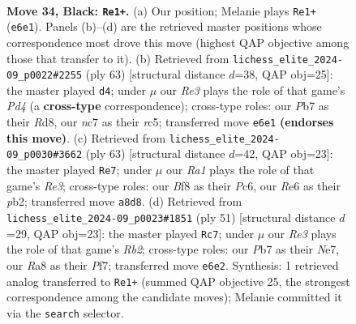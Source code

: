 \documentclass[11pt]{article}
\begin{document}
\clearpage

\begin{figure}[p]\centering
\begin{subfigure}{0.46\textwidth}\centering
\resizebox{\linewidth}{!}{%
\newchessgame
\chessboard[
  setfen={r4b2/ppN4k/4rpp1/7p/P7/6P1/RPP2P1P/6K1 b - - 0 34},
  showmover=false,
  pgfstyle=straightmove, color=movearrow, markmove={e6-e1}
]}
\caption{}
\end{subfigure}\hfill
\begin{subfigure}{0.46\textwidth}\centering
\resizebox{\linewidth}{!}{%
\newchessgame
\chessboard[
  setfen={3r2k1/pp2r1p1/6N1/2Rp4/8/1P5P/P4RP1/6K1 b - - 0 32},
  showmover=false,
  pgfstyle=straightmove, color=movearrow, markmove={d5-d4}
]}
\caption{}
\end{subfigure}
\\[4pt]
\begin{subfigure}{0.46\textwidth}\centering
\resizebox{\linewidth}{!}{%
\newchessgame
\chessboard[
  setfen={8/p5k1/2p1r2p/2N3p1/P7/2P2P2/1P3P1b/3R1K2 b - - 2 32},
  showmover=false,
  pgfstyle=straightmove, color=movearrow, markmove={e6-e7}
]}
\caption{}
\end{subfigure}\hfill
\begin{subfigure}{0.46\textwidth}\centering
\resizebox{\linewidth}{!}{%
\newchessgame
\chessboard[
  setfen={6k1/pr2npp1/3Np2p/2P5/8/4P1P1/P4PP1/2R3K1 b - - 2 26},
  showmover=false,
  pgfstyle=straightmove, color=movearrow, markmove={b7-c7}
]}
\caption{}
\end{subfigure}
\caption{\textbf{Move 34, Black: \texttt{Re1+}.} (a) Our position; Melanie plays \texttt{Re1+} (\texttt{e6e1}). Panels (b)--(d) are the retrieved master positions whose correspondence most drove this move (highest QAP objective among those that transfer to it). (b) Retrieved from \texttt{lichess\_elite\_2024-09\_p0022\#2255} (ply 63) [structural distance $d$=38, QAP obj=25]: the master played \texttt{d4}; under $\mu$ our \emph{Re3} plays the role of that game's \emph{Pd4} (a \textbf{cross-type} correspondence); cross-type roles: our \emph{P}b7 as their \emph{R}d8, our \emph{n}c7 as their \emph{r}c5; transferred move \texttt{e6e1} \textbf{(endorses this move)}. (c) Retrieved from \texttt{lichess\_elite\_2024-09\_p0030\#3662} (ply 63) [structural distance $d$=42, QAP obj=23]: the master played \texttt{Re7}; under $\mu$ our \emph{Ra1} plays the role of that game's \emph{Re3}; cross-type roles: our \emph{B}f8 as their \emph{P}c6, our \emph{R}e6 as their \emph{p}b2; transferred move \texttt{a8d8}. (d) Retrieved from \texttt{lichess\_elite\_2024-09\_p0023\#1851} (ply 51) [structural distance $d$=29, QAP obj=23]: the master played \texttt{Rc7}; under $\mu$ our \emph{Re3} plays the role of that game's \emph{Rb2}; cross-type roles: our \emph{P}b7 as their \emph{N}e7, our \emph{R}a8 as their \emph{P}f7; transferred move \texttt{e6e2}. Synthesis: 1 retrieved analog transferred to \texttt{Re1+} (summed QAP objective 25, the strongest correspondence among the candidate moves); Melanie committed it via the \texttt{search} selector.}
\label{fig:thought-m67}
\end{figure}
\end{document}
